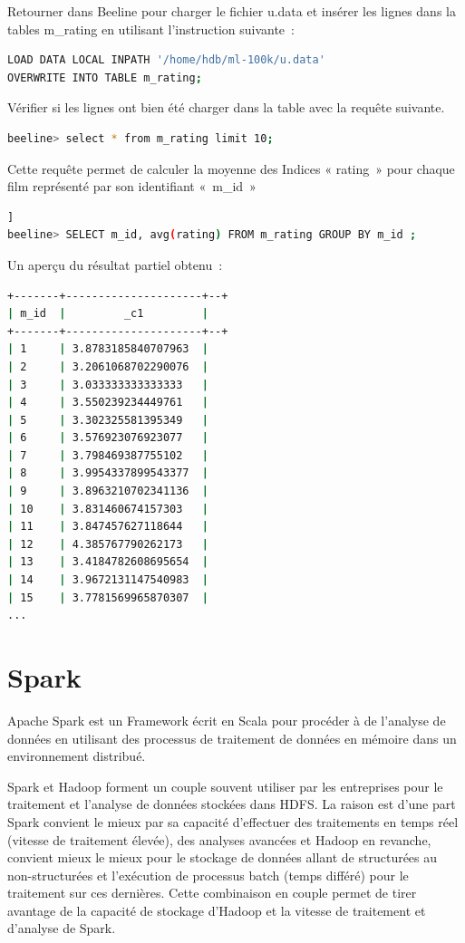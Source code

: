 \documentclass[12pt,french]{book}
\begin{document}
Retourner dans Beeline pour charger le fichier u.data et insérer les lignes dans la tables m\_rating en utilisant l’instruction suivante :

\begin{lstlisting}[language=bash, frame=single]
LOAD DATA LOCAL INPATH '/home/hdb/ml-100k/u.data'
OVERWRITE INTO TABLE m_rating;
\end{lstlisting}

Vérifier si les lignes ont bien été charger dans la table avec la requête suivante.

\begin{lstlisting}[language=bash, frame=single]
beeline> select * from m_rating limit 10;
\end{lstlisting}

Cette requête permet de calculer la moyenne des Indices « rating » pour chaque film représenté par son identifiant « m\_id » 

\begin{lstlisting}[language=bash, frame=single, breaklines=true, postbreak=\mbox{\textcolor{red}{$\hookrightarrow$}\space}]]
beeline> SELECT m_id, avg(rating) FROM m_rating GROUP BY m_id ;
\end{lstlisting}

Un aperçu du résultat partiel obtenu :

\begin{lstlisting}[language=bash, frame=single]
+-------+---------------------+--+
| m_id  |         _c1         |
+-------+---------------------+--+
| 1     | 3.8783185840707963  |
| 2     | 3.2061068702290076  |
| 3     | 3.033333333333333   |
| 4     | 3.550239234449761   |
| 5     | 3.302325581395349   |
| 6     | 3.576923076923077   |
| 7     | 3.798469387755102   |
| 8     | 3.9954337899543377  |
| 9     | 3.8963210702341136  |
| 10    | 3.831460674157303   |
| 11    | 3.847457627118644   |
| 12    | 4.385767790262173   |
| 13    | 3.4184782608695654  |
| 14    | 3.9672131147540983  |
| 15    | 3.7781569965870307  |
...
\end{lstlisting}

\section{Spark}

Apache Spark est un Framework écrit en Scala pour procéder à de l’analyse de données en utilisant des processus de traitement de données en mémoire dans un environnement distribué.

Spark et Hadoop forment un couple souvent utiliser par les entreprises pour le traitement et l’analyse de données stockées dans HDFS. La raison est d’une part Spark convient le mieux par sa capacité d’effectuer des traitements en temps réel (vitesse de traitement élevée), des analyses avancées et Hadoop en revanche, convient mieux le mieux pour le stockage de données allant de structurées au non-structurées et l’exécution de processus batch (temps différé) pour le traitement sur ces dernières.
Cette combinaison en couple permet de tirer avantage de la capacité de stockage d’Hadoop et la vitesse de traitement et d’analyse de Spark.    
\end{document}

